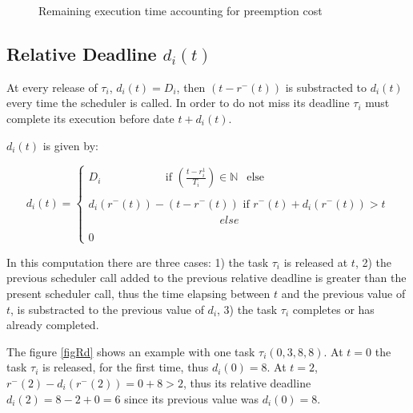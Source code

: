 \documentclass[conference,compsocconf]{IEEEtran}
\begin{document}
\begin{figure}[!h]
\begin{center}

\caption{Remaining execution time accounting for preemption cost}
\label{figRet}
\end{center}
\end{figure}

\subsection{Relative Deadline $d_i(t)$} 

At every release of $\tau_i$, $d_i(t)=D_i$, then $(t-r^{-}(t))$ is substracted
to $d_i(t)$ every time the scheduler is called. In order to do not miss its
deadline $\tau_i$ must complete its execution before date $t+d_i(t)$.

$d_i(t)$ is given by:

\begin{equation*}
  d_i(t)= \left\{
            \begin{array}{ll}
             D_i \ \ \ \ \ \ \ \ \ \ \ \ \ \ \ \ \ \ \ \ \ \ \ \ \ \ \mbox{if $(\frac{t-r_i^1}{T_i}) \in \mathbb{N} \ \ $ else } \\ \\
             d_i(r^{-}(t))-(t-r^{-}(t))  \mbox{\ if $r^{-}(t)+d_i(r^{-}(t))>t $}
               \\ \ \ \ \ \ \ \ \ \ \ \ \ \ \ \ \ \ \ \ \ \ \ \ \ \ \ \ \ \ \ \ \ \ \ \ \ \ \ \ \ \ \ \ \ \ \ \ \ \ \ \ \ \ else  \\ \\
             0 \ \ \  \mbox{} 
            \end{array}
          \right.
\end{equation*}

In this computation there are three cases: 1) the task $\tau_i$ is released at
$t$, 2) the previous scheduler call added to the previous relative deadline is
greater than the present scheduler call, thus the time elapsing between $t$ and
the previous value of $t$, is substracted to the previous value of $d_i$, 3)
the task $\tau_i$ completes or has already completed.

The figure \ref{figRd} shows an example with one task $\tau_i(0,3,8,8)$. At
$t=0$ the task $\tau_i$ is released, for the first time, thus $d_i(0)=8$. At
$t=2$, $r^{-}(2)-d_i(r^{-}(2))=0+8 > 2$, thus its relative deadline
$d_i(2)=8-2+0=6$ since its previous value was $d_i(0)=8$.
\end{document}
